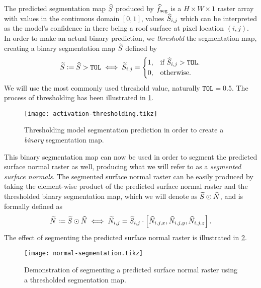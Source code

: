 The predicted segmentation map $\widehat{S}$ produced by $\widehat{f}_{\mathrm{seg}}$ is a $H \times W \times 1$ raster array with values in the continuous domain $[0, 1]$, values $\widehat{S}_{i,j}$ which can be interpreted as the model's confidence in there being a roof surface at pixel location $(i, j)$.
In order to make an actual binary prediction, we \textit{threshold} the segmentation map, creating a binary segmentation map $\widetilde{S}$ defined by
\begin{equation*}
  \widetilde{S} \vcentcolon= \widehat{S} > \texttt{TOL}
  \iff
  \widetilde{S}_{i, j}
  =
  \begin{cases}
    1, &\text{if } \widehat{S}_{i, j} > \texttt{TOL}. \\
    0, &\text{otherwise.}
  \end{cases}
\end{equation*}
We will use the most commonly used threshold value, naturally $\texttt{TOL} = 0.5$.
The process of thresholding has been illustrated in \cref{fig:activation-thresholding}.
\begin{figure}[H]
  \centering
  \texttt{[image: activation-thresholding.tikz]}
  \caption{Thresholding model segmentation prediction in order to create a \textit{binary} segmentation map.}%
  \label{fig:activation-thresholding}
\end{figure}
\noindent
This binary segmentation map can now be used in order to segment the predicted surface normal raster as well, producing what we will refer to as a \textit{segmented surface normals}.
The segmented surface normal raster can be easily produced by taking the element-wise product of the predicted surface normal raster and the thresholded binary segmentation map, which we will denote as $\widetilde{S} \odot \widehat{N}$, and is formally defined as
\begin{equation*}
  \widetilde{N} \vcentcolon= \widetilde{S} \odot \widehat{N}
  \iff
  \widetilde{N}_{i, j}
  =
    \widetilde{S}_{i, j}
    \cdot
    \left[\widehat{N}_{i,j,x}, \widehat{N}_{i,j,y}, \widehat{N}_{i,j,z}\right].
\end{equation*}
The effect of segmenting the predicted surface normal raster is illustrated in \cref{fig:normal-segmentation}.
\begin{figure}[H]
  \centering
  \texttt{[image: normal-segmentation.tikz]}
  \caption{Demonstration of segmenting a predicted surface normal raster using a thresholded segmentation map.}%
  \label{fig:normal-segmentation}
\end{figure}
